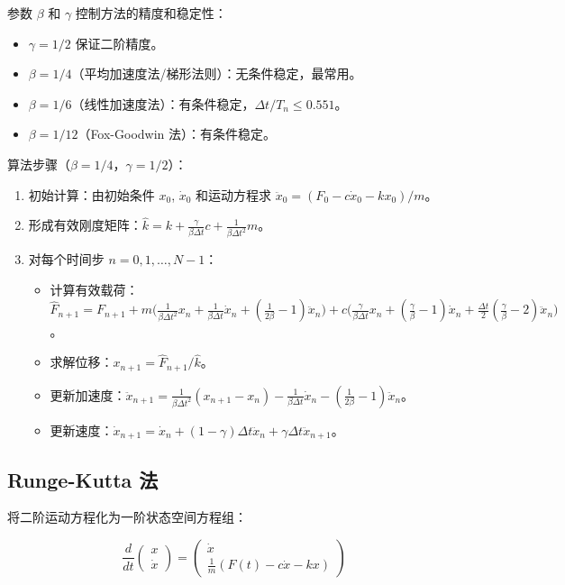 参数 $\beta$ 和 $\gamma$ 控制方法的精度和稳定性：

\begin{itemize}
\item $\gamma = 1/2$ 保证二阶精度。
\item $\beta = 1/4$（平均加速度法/梯形法则）：无条件稳定，最常用。
\item $\beta = 1/6$（线性加速度法）：有条件稳定，$\Delta t/T_n \leq 0.551$。
\item $\beta = 1/12$（Fox-Goodwin 法）：有条件稳定。
\end{itemize}

算法步骤（$\beta=1/4$，$\gamma=1/2$）：

\begin{enumerate}
\item 初始计算：由初始条件 $x_0$, $\dot{x}_0$ 和运动方程求 $\ddot{x}_0 = (F_0 - c\dot{x}_0 - kx_0)/m$。
\item 形成有效刚度矩阵：$\hat{k} = k + \frac{\gamma}{\beta\Delta t}c + \frac{1}{\beta\Delta t^2}m$。
\item 对每个时间步 $n = 0, 1, \ldots, N-1$：
  \begin{itemize}
  \item 计算有效载荷：$\hat{F}_{n+1} = F_{n+1} + m\bigl(\frac{1}{\beta\Delta t^2}x_n + \frac{1}{\beta\Delta t}\dot{x}_n + (\frac{1}{2\beta}-1)\ddot{x}_n\bigr) + c\bigl(\frac{\gamma}{\beta\Delta t}x_n + (\frac{\gamma}{\beta}-1)\dot{x}_n + \frac{\Delta t}{2}(\frac{\gamma}{\beta}-2)\ddot{x}_n\bigr)$。
  \item 求解位移：$x_{n+1} = \hat{F}_{n+1}/\hat{k}$。
  \item 更新加速度：$\ddot{x}_{n+1} = \frac{1}{\beta\Delta t^2}(x_{n+1} - x_n) - \frac{1}{\beta\Delta t}\dot{x}_n - (\frac{1}{2\beta}-1)\ddot{x}_n$。
  \item 更新速度：$\dot{x}_{n+1} = \dot{x}_n + (1-\gamma)\Delta t\ddot{x}_n + \gamma\Delta t\ddot{x}_{n+1}$。
  \end{itemize}
\end{enumerate}

\subsection{Runge-Kutta 法}

将二阶运动方程化为一阶状态空间方程组：

\[
\frac{d}{dt} \begin{pmatrix} x \\ \dot{x} \end{pmatrix} = 
\begin{pmatrix} \dot{x} \\ \frac{1}{m}(F(t) - c\dot{x} - kx) \end{pmatrix}
\]

